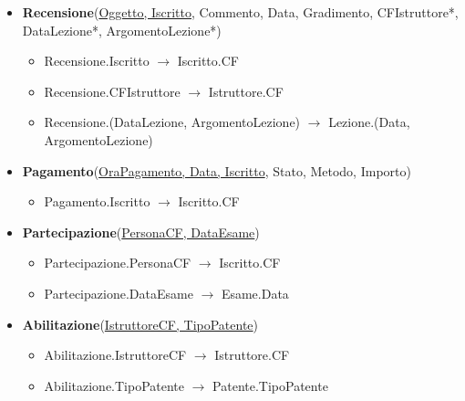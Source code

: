 \documentclass[10pt,twoside]{article}
\begin{document}
{{\begin{itemize}
\begin{itemize}
            \end{itemize}
            \item \textbf{Recensione}(\underline{Oggetto, Iscritto}, Commento, Data, Gradimento, CFIstruttore*, DataLezione*, ArgomentoLezione*)
            \begin{itemize}
                \item Recensione.Iscritto $\rightarrow$ Iscritto.CF
                \item Recensione.CFIstruttore $\rightarrow$ Istruttore.CF
                \item Recensione.(DataLezione, ArgomentoLezione) $\rightarrow$ Lezione.(Data, ArgomentoLezione)
            \end{itemize}
            \item \textbf{Pagamento}(\underline{OraPagamento, Data, Iscritto}, Stato, Metodo, Importo)
            \begin{itemize}
                \item Pagamento.Iscritto $\rightarrow$ Iscritto.CF
            \end{itemize}
            \item \textbf{Partecipazione}(\underline{PersonaCF, DataEsame})
            \begin{itemize}
                \item Partecipazione.PersonaCF $\rightarrow$ Iscritto.CF
                \item Partecipazione.DataEsame $\rightarrow$ Esame.Data
            \end{itemize}
            \item \textbf{Abilitazione}(\underline{IstruttoreCF, TipoPatente})
            \begin{itemize}
                \item Abilitazione.IstruttoreCF $\rightarrow$ Istruttore.CF
                \item Abilitazione.TipoPatente $\rightarrow$ Patente.TipoPatente
            \end{itemize}
        \end{itemize}
    }
}
\end{document}
